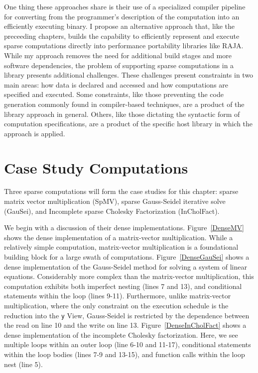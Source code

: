 One thing these approaches share is their use of a specialized compiler pipeline for converting from the programmer's description of the computation into an efficiently executing binary. 
I propose an alternative approach that, like the preceeding chapters, builds the capability to efficiently represent and execute sparse computations directly into performance portability libraries like RAJA. 
While my approach removes the need for additional build stages and more software dependencies, the problem of supporting sparse computations in a library presents additional challenges.
These challenges present constraints in two main areas: how data is declared and accessed and how computations are specified and executed. 
Some constraints, like those preventing the code generation commonly found in compiler-based techniques, are a product of the library approach in general.
Others, like those dictating the syntactic form of computation specifications, are a product of the specific host library in which the approach is applied.






\section{Case Study Computations}

Three sparse computations will form the case studies for this chapter: sparse matrix vector multiplication (SpMV), sparse Gauss-Seidel iterative solve (GauSei), and Incomplete sparse Cholesky Factorization (InCholFact). 

We begin with a discussion of their dense implementations.
Figure~\ref{DenseMV} shows the dense implementation of a matrix-vector multiplication.
While a relatively simple computation, matrix-vector multiplication is a foundational building block for a large swath of computations.
Figure~\ref{DenseGauSei} shows a dense implementation of the Gauss-Seidel method for solving a system of linear equations.
Considerably more complex than the matrix-vector multiplication, this computation exhibits both imperfect nesting (lines 7 and 13), and conditional statements within the loop (lines 9-11). 
Furthermore, unlike matrix-vector multiplication, where the only constraint on the execution schedule is the reduction into the \verb.y. View, Gauss-Seidel is restricted by the dependence between the read on line 10 and the write on line 13. 
Figure~\ref{DenseInCholFact} shows a dense implementation of the incomplete Cholesky factorization. 
Here, we see multiple loops within an outer loop (line 6-10 and 11-17), conditional statements within the loop bodies (lines 7-9 and 13-15), and function calls within the loop nest (line 5).

